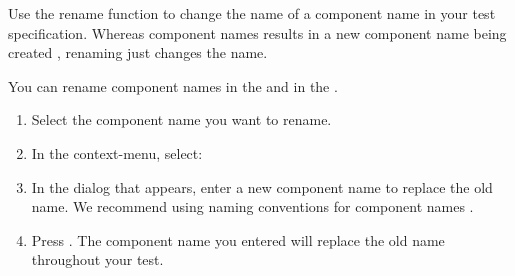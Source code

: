 
Use the rename function to change the name of a component name in your test specification. Whereas  component names results in a new component name being created , renaming just changes the name. 

You can rename component names in the \gdcompnamebrowser{}  and in the \gdomeditor{}. 
\begin{enumerate}
\item Select the component name you want to rename. 
\item In the context-menu, select:\\
\item In the dialog that appears, enter a new component name to replace the old name. We recommend using naming conventions for component names . 
\item Press . The component name you entered will replace the old name throughout your test. 
\end{enumerate}

